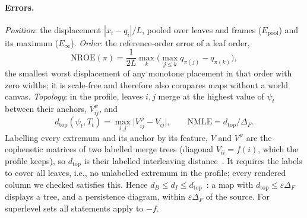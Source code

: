 \documentclass[review]{vgtc}                 %
\newcommand{\dtop}{d_{\mathrm{top}}}
\newcommand{\nroe}{\mathrm{NROE}}
\begin{document}
\paragraph{Errors.} \emph{Position}: the displacement $|x_i-q_i|/L$, pooled over leaves and frames ($E_{\mathrm{pool}}$) and its maximum ($E_\infty$). \emph{Order}: the reference-order error of a leaf order,
\begin{equation}\label{eq:nroe}
\nroe(\pi)=\frac{1}{2L}\max_{k}\Big(\max_{j\le k} q_{\pi(j)}-q_{\pi(k)}\Big),
\end{equation}
the smallest worst displacement of any monotone placement in that order with zero widths; it is scale-free and therefore also compares maps without a world canvas. \emph{Topology}: in the profile, leaves $i,j$ merge at the highest value of $\psi_t$ between their anchors, $V^\psi_{ij}$, and
\begin{equation}\label{eq:dtop}
\dtop(\psi_t,T_t)=\max_{i,j}\big|V^{\psi}_{ij}-V_{ij}\big|,\qquad \mathrm{NMLE}=\dtop/\Delta_F .
\end{equation}
Labelling every extremum and its anchor by its feature, $V$ and $V^\psi$ are the cophenetic matrices of two labelled merge trees (diagonal $V_{ii}=f(i)$, which the profile keeps), so $\dtop$ is their labelled interleaving distance~\cite{Gasparovic:2024:IID,Munch:2019:LINF}. It requires the labels to cover all leaves, i.e., no unlabelled extremum in the profile; every rendered column we checked satisfies this. Hence $d_B\le d_I\le\dtop$~\cite{Gasparovic:2024:IID,Morozov:2013:IDMT}: a map with $\dtop\le\varepsilon\Delta_F$ displays a tree, and a persistence diagram, within $\varepsilon\Delta_F$ of the source. For superlevel sets all statements apply to $-f$.
\end{document}
